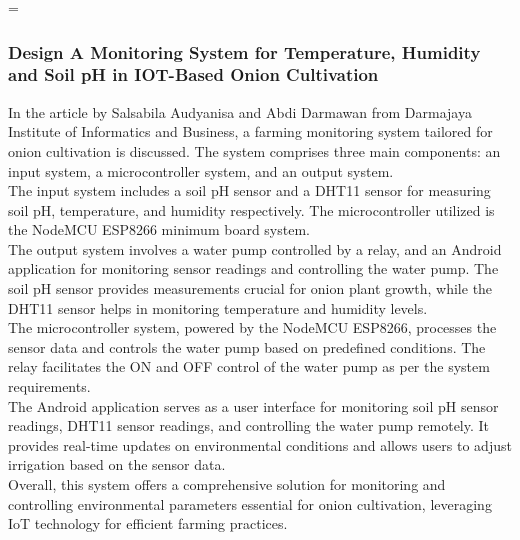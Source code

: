 =\documentclass[12pt, a4paper]{article}
\begin{document}
\subsubsection{Design A Monitoring System for Temperature, Humidity and Soil pH in IOT-Based Onion Cultivation}
In the article by Salsabila Audyanisa and Abdi Darmawan \cite{audyanisa2024design} from Darmajaya Institute of Informatics and Business, a farming monitoring system tailored for onion cultivation is discussed. The system comprises three main components: an input system, a microcontroller system, and an output system.\\
The input system includes a soil pH sensor and a DHT11 sensor for measuring soil pH, temperature, and humidity respectively. The microcontroller utilized is the NodeMCU ESP8266 minimum board system.\\
The output system involves a water pump controlled by a relay, and an Android application for monitoring sensor readings and controlling the water pump. The soil pH sensor provides measurements crucial for onion plant growth, while the DHT11 sensor helps in monitoring temperature and humidity levels.\\
The microcontroller system, powered by the NodeMCU ESP8266, processes the sensor data and controls the water pump based on predefined conditions. The relay facilitates the ON and OFF control of the water pump as per the system requirements.\\
The Android application serves as a user interface for monitoring soil pH sensor readings, DHT11 sensor readings, and controlling the water pump remotely. It provides real-time updates on environmental conditions and allows users to adjust irrigation based on the sensor data.\\
Overall, this system offers a comprehensive solution for monitoring and controlling environmental parameters essential for onion cultivation, leveraging IoT technology for efficient farming practices.
\end{document}
